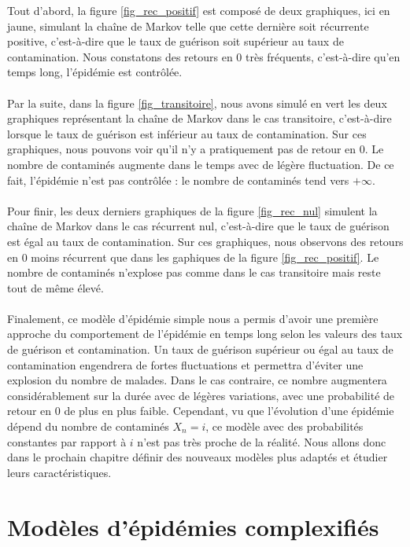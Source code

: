 \documentclass[12pt,a4paper]{report}
\theoremstyle{remark}
\begin{document}
Tout d'abord, la figure \ref{fig_rec_positif} est composé de deux graphiques, ici en jaune, simulant la chaîne de Markov telle que cette dernière soit récurrente positive, c'est-à-dire que le taux de guérison soit supérieur au taux de contamination. Nous constatons des retours en $0$ très fréquents, c'est-à-dire qu'en temps long, l'épidémie est contrôlée. \\
\\
Par la suite, dans la figure \ref{fig_transitoire}, nous avons simulé en vert les deux graphiques représentant la chaîne de Markov dans le cas transitoire, c'est-à-dire lorsque le taux de guérison est inférieur au taux de contamination. Sur ces graphiques, nous pouvons voir qu'il n'y a pratiquement pas de retour en $0$. Le nombre de contaminés augmente dans le temps avec de légère fluctuation. De ce fait, l'épidémie n'est pas contrôlée : le nombre de contaminés tend vers $+\infty$.\\
\\
Pour finir, les deux derniers graphiques de la figure \ref{fig_rec_nul} simulent la chaîne de Markov dans le cas récurrent nul, c'est-à-dire que le taux de guérison est égal au taux de contamination. Sur ces graphiques, nous observons des retours en $0$ moins récurrent que dans les gaphiques de la figure \ref{fig_rec_positif}. Le nombre de contaminés n'explose pas comme dans le cas transitoire mais reste tout de même élevé.
\\
\\
Finalement, ce modèle d'épidémie simple nous a permis d'avoir une première approche du comportement de l'épidémie en temps long selon les valeurs des taux de guérison et contamination. Un taux de guérison supérieur ou égal au taux de contamination engendrera de fortes fluctuations et permettra d'éviter une explosion du nombre de malades. Dans le cas contraire, ce nombre augmentera considérablement sur la durée avec de légères variations, avec une probabilité de retour en $0$ de plus en plus faible. Cependant, vu que l'évolution d'une épidémie dépend du nombre de contaminés $X_n = i$, ce modèle avec des probabilités constantes par rapport à $i$ n'est pas très proche de la réalité. Nous allons donc dans le prochain chapitre définir des nouveaux modèles plus adaptés et étudier leurs caractéristiques.

\chapter{Modèles d'épidémies complexifiés}
\end{document}
